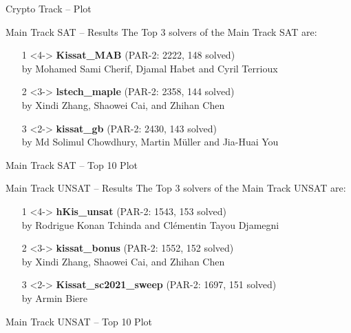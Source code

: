 \documentclass[trans]{beamer}
\begin{document}
\begin{frame}{Crypto Track -- Plot}
\centering
{}
\end{frame}


\begin{frame}{Main Track SAT -- Results}
The Top 3 solvers of the Main Track SAT are:
\begin{itemize}
\item[1]<4-> {\bf Kissat\_MAB} (PAR-2: 2222, 148 solved)\\
by Mohamed Sami Cherif, Djamal Habet and Cyril Terrioux
\item[2]<3-> {\bf lstech\_maple}  (PAR-2: 2358, 144 solved)\\
by Xindi Zhang, Shaowei Cai, and Zhihan Chen
\item[3]<2-> {\bf kissat\_gb} (PAR-2: 2430, 143 solved)\\
by Md Solimul Chowdhury, Martin Müller and Jia-Huai You
\end{itemize}
\end{frame}

\begin{frame}{Main Track SAT -- Top 10 Plot}
\centering
\resizebox{.9\textwidth}{!}{%

}
\end{frame}

\begin{frame}{Main Track UNSAT -- Results}
The Top 3 solvers of the Main Track UNSAT are:
\begin{itemize}
\item[1]<4-> 
{\bf hKis\_unsat}  (PAR-2: 1543, 153 solved)\\
by Rodrigue Konan Tchinda and Clémentin Tayou Djamegni
\item[2]<3-> {\bf kissat\_bonus} (PAR-2: 1552, 152 solved)\\
by Xindi Zhang, Shaowei Cai, and Zhihan Chen
\item[3]<2-> {\bf Kissat\_sc2021\_sweep} (PAR-2: 1697, 151 solved)  \\
by Armin Biere
\end{itemize}
\end{frame}


\begin{frame}{Main Track UNSAT -- Top 10 Plot}
\centering
\resizebox{.9\textwidth}{!}{%

}
\end{frame}
\end{document}
